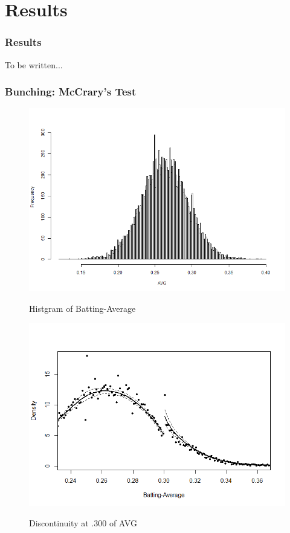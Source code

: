 \documentclass[dvipdfmx,12pt]{beamer}
\begin{document}
\section{Results}

\begin{frame}\frametitle{Results}
  \huge
  To be written...
\end{frame}

\begin{frame}\frametitle{Bunching: McCrary's Test}
  \begin{figure}
    \centering
    \caption{Histgram of Batting-Average}        \includegraphics[keepaspectratio, scale = 0.35, angle=0]{graphs/hist_AVG_all.png}
    \label{AVG_Histgram}
  \end{figure}
\end{frame}

\begin{frame}
  \begin{figure}
    \centering
    \caption{Discontinuity at .300 of AVG}
    \includegraphics[keepaspectratio, scale = 0.5, angle = 0]{graphs/AVG_300.png}
    \label{DCdensity_AVG_300}
  \end{figure}
\end{frame}
\end{document}
